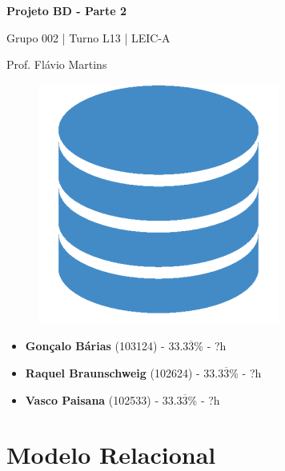 \documentclass[12pt,a4paper]{article}
\begin{document}
\begin{titlepage}
    \begin{center}
        \vspace*{5cm}

        \Huge
        \textbf{Projeto BD - Parte 2}

        \vspace{0.5cm}
        \LARGE
        Grupo 002 | Turno L13 | LEIC-A

        \vspace{0.5cm}
        \large
        Prof. Flávio Martins

        \vspace{0.5cm}
        \begin{figure}[h]
            \centering
            \includegraphics[scale=0.5]{report_logo.png}
        \end{figure}

        \vfill

        \large
        \begin{minipage}{0.8\textwidth}
            \begin{itemize}
                \item[] \textbf{Gonçalo Bárias} (103124) - 33.3$\overline{3}$\% - ?h
                \item[] \textbf{Raquel Braunschweig} (102624) - 33.3$\overline{3}$\% - ?h
                \item[] \textbf{Vasco Paisana} (102533) - 33.3$\overline{3}$\% - ?h
            \end{itemize}
        \end{minipage}
    \end{center}
\end{titlepage}

\section*{Modelo Relacional}
\end{document}
